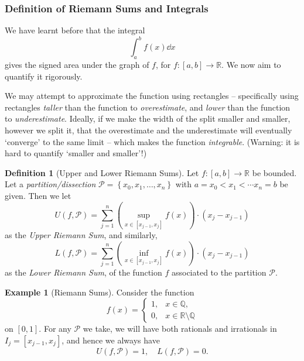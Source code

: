 \documentclass[11pt]{article}
\numberwithin{equation}{section}
\theoremstyle{definition}
\newtheorem{definition}[theorem]{Definition}
\newtheorem{example}[theorem]{Example}
\theoremstyle{remark}
\newcommand{\pqty}[1]{\left(#1\right)}
\newcommand{\Bqty}[1]{\left\{#1\right\}}
\newcommand{\ccintv}[2]{[#1,#2]}
\newcommand{\functiondomain}[3]{#1:#2\to #3}
\newcommand{\RR}{\mathbb R}
\newcommand{\QQ}{\mathbb Q}
\newcommand{\partition}{\mathcal P}
\newcommand{\upperSum}{U}
\newcommand{\lowerSum}{L}
\begin{document}
\subsubsection{Definition of Riemann Sums and Integrals}

We have learnt before that the integral
\[
    \int_{a}^{b} f\pqty{x} \dd{x}
\]
gives the signed area under the graph of \(f\), for \(\functiondomain{f}{\ccintv{a}{b}}{\RR}\). We now aim to quantify it rigorously.

We may attempt to approximate the function using rectangles -- specifically using rectangles \emph{taller} than the function to \emph{overestimate}, and \emph{lower} than the function to \emph{underestimate}. Ideally, if we make the width of the split smaller and smaller, however we split it, that the overestimate and the underestimate will eventually `converge' to the same limit -- which makes the function \emph{integrable}. (Warning: it is hard to quantify `smaller and smaller'!)

\begin{definition}[Upper and Lower Riemann Sums]\label{analysis-unit-0138}
    \label{def:upper-lower-riemann-sum}%
    Let \(\functiondomain{f}{\ccintv{a}{b}}{\RR}\) be bounded. Let a \emph{partition/dissection} \(\partition = \Bqty{x_0, x_1, \ldots, x_n}\) with \(a = x_0 < x_1 < \cdots x_n = b\) be given. Then we let
    \[
        \upperSum \pqty{f, \partition} = \sum_{j = 1}^{n} \pqty{\sup_{x \in \ccintv{x_{j - 1}}{x_{j}}} f\pqty{x}} \cdot \pqty{x_j - x_{j - 1}}
    \]
    as the \emph{Upper Riemann Sum}, and similarly,
    \[
        \lowerSum \pqty{f, \partition} = \sum_{j = 1}^{n} \pqty{\inf_{x \in \ccintv{x_{j - 1}}{x_{j}}} f\pqty{x}} \cdot \pqty{x_j - x_{j - 1}}
    \]
    as the \emph{Lower Riemann Sum}, of the function \(f\) associated to the partition \(\partition\).
\end{definition}

\begin{example}[Riemann Sums]\label{analysis-unit-0139}
    \label{ex:riemann-sums}%
    Consider the function
    \[
        f\pqty{x} = \begin{cases}
            1, & x \in \QQ, \\
            0, & x \in \RR \setminus \QQ
        \end{cases}
    \]
    on \(\ccintv{0}{1}\). For any \(\partition\) we take, we will have both rationals and irrationals in \(I_j = \ccintv{x_{j - 1}}{x_j}\), and hence we always have
    \[
        \upperSum \pqty{f, \partition} = 1, \quad \lowerSum \pqty{f, \partition} = 0.
    \]
\end{example}
\end{document}
